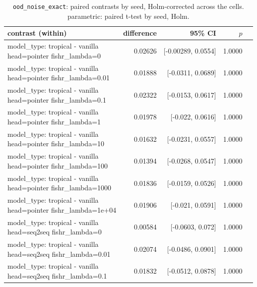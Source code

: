 \documentclass[10pt]{article}
\makeatletter
\newcommand{\stackcell}[1]{\begin{tabular}[t]{@{}l@{}}#1\end{tabular}}
\makeatother
\begin{document}
{\small
\begin{longtable}{lrrrl}
\caption{\texttt{ood\_noise\_exact}: paired contrasts by seed, Holm-corrected across the cells. parametric: paired t-test by seed, Holm.}\label{tab:paired-ood_noise_exact}\\
\toprule
contrast (within) & difference & 95\% CI & $p$ & \\
\midrule
\endhead
\stackcell{model\_type: tropical - vanilla\\\footnotesize head=pointer fishr\_lambda=0 } & 0.02626 & [-0.00289, 0.0554] & 1.0000 & \\
\stackcell{model\_type: tropical - vanilla\\\footnotesize head=pointer fishr\_lambda=0.01 } & 0.01888 & [-0.0311, 0.0689] & 1.0000 & \\
\stackcell{model\_type: tropical - vanilla\\\footnotesize head=pointer fishr\_lambda=0.1 } & 0.02322 & [-0.0153, 0.0617] & 1.0000 & \\
\stackcell{model\_type: tropical - vanilla\\\footnotesize head=pointer fishr\_lambda=1 } & 0.01978 & [-0.022, 0.0616] & 1.0000 & \\
\stackcell{model\_type: tropical - vanilla\\\footnotesize head=pointer fishr\_lambda=10 } & 0.01632 & [-0.0231, 0.0557] & 1.0000 & \\
\stackcell{model\_type: tropical - vanilla\\\footnotesize head=pointer fishr\_lambda=100 } & 0.01394 & [-0.0268, 0.0547] & 1.0000 & \\
\stackcell{model\_type: tropical - vanilla\\\footnotesize head=pointer fishr\_lambda=1000 } & 0.01836 & [-0.0159, 0.0526] & 1.0000 & \\
\stackcell{model\_type: tropical - vanilla\\\footnotesize head=pointer fishr\_lambda=1e+04 } & 0.01906 & [-0.021, 0.0591] & 1.0000 & \\
\stackcell{model\_type: tropical - vanilla\\\footnotesize head=seq2seq fishr\_lambda=0 } & 0.00584 & [-0.0603, 0.072] & 1.0000 & \\
\stackcell{model\_type: tropical - vanilla\\\footnotesize head=seq2seq fishr\_lambda=0.01 } & 0.02074 & [-0.0486, 0.0901] & 1.0000 & \\
\stackcell{model\_type: tropical - vanilla\\\footnotesize head=seq2seq fishr\_lambda=0.1 } & 0.01832 & [-0.0512, 0.0878] & 1.0000 & \\

\end{longtable}}
\end{document}
